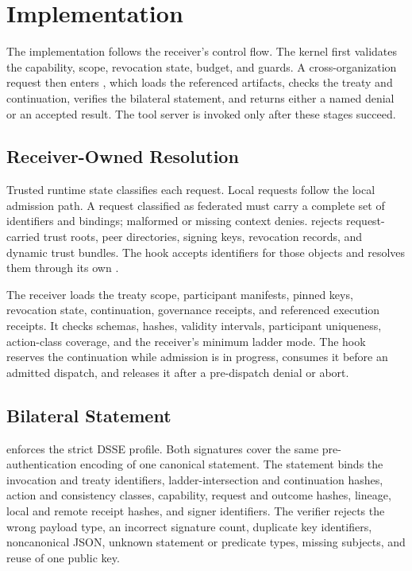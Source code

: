 \section{Implementation}
\label{sec:implementation}

The implementation follows the receiver's control flow. The kernel first
validates the capability, scope, revocation state, budget, and guards. A
cross-organization request then enters
, which loads the referenced
artifacts, checks the treaty and continuation, verifies the bilateral
statement, and returns either a named denial or an accepted result. The tool
server is invoked only after these stages succeed.

\subsection{Receiver-Owned Resolution}

Trusted runtime state classifies each request. Local requests follow the local
admission path. A request classified as federated must carry a complete set of
identifiers and bindings; malformed or missing context denies.
 rejects request-carried trust roots, peer
directories, signing keys, revocation records, and dynamic trust bundles. The
hook accepts identifiers for those objects and resolves them through its own
.

The receiver loads the treaty scope, participant manifests, pinned keys,
revocation state, continuation, governance receipts, and referenced execution
receipts. It checks schemas, hashes, validity intervals, participant
uniqueness, action-class coverage, and the receiver's minimum ladder mode. The
hook reserves the continuation while admission is in progress, consumes it
before an admitted dispatch, and releases it after a pre-dispatch denial or
abort.

\subsection{Bilateral Statement}

 enforces the strict DSSE profile.
Both signatures cover the same pre-authentication encoding of one canonical
statement. The statement binds the invocation and treaty identifiers,
ladder-intersection and continuation hashes, action and consistency classes,
capability, request and outcome hashes, lineage, local and remote receipt
hashes, and signer identifiers. The verifier rejects the wrong payload type,
an incorrect signature count, duplicate key identifiers, noncanonical JSON,
unknown statement or predicate types, missing subjects, and reuse of one
public key.

